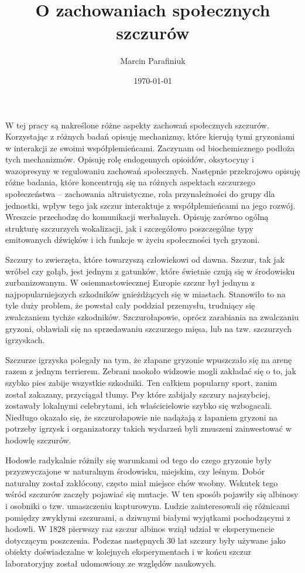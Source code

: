 \documentclass{psychol}
\title{O zachowaniach społecznych szczurów}
\author{Marcin Parafiniuk}
\date{\today}
\begin{document}
\maketitle
\tableofcontents
\doublespacing

\pagebreak


W tej pracy są nakreślone różne aspekty zachowań społecznych szczurów. Korzystając z różnych badań opisuję mechanizmy, które kierują tymi gryzoniami w interakcji ze swoimi współplemieńcami. Zaczynam od biochemicznego podłoża tych mechanizmów. Opisuję rolę endogennych opioidów, oksytocyny i wazopresyny w regulowaniu zachowań społecznych. Następnie przekrojowo opisuję różne badania, które koncentrują się na różnych aspektach szczurzego społeczeństwa -- zachowania altruistyczne, rola przynależności do grupy dla jednostki, wpływ tego jak szczur interaktuje z współplemieńcami na jego rozwój. Wreszcie przechodzę do komunikacji werbalnych. Opisuję zarówno ogólną strukturę szczurzych wokalizacji, jak i szczegółowo poszczególne typy emitowanych dźwięków i ich funkcje w życiu społeczności tych gryzoni.


Szczury to zwierzęta, które towarzyszą człowiekowi od dawna. Szczur, tak jak wróbel czy gołąb, jest jednym z gatunków, które świetnie czują się w środowisku zurbanizowanym. W osiemnastowiecznej Europie szczur był jednym z najpopularniejszych szkodników gnieżdżących się w miastach. Stanowiło to na tyle duży problem, że powstał cały poddział przemysłu, trudniący się zwalczaniem tychże szkodników. Szczurołapowie, oprócz zarabiania na zwalczaniu gryzoni, obławiali się na sprzedawaniu szczurzego mięsa, lub na tzw. szczurzych igrzyskach.

Szczurze igrzyska polegały na tym, że złapane gryzonie wpuszczało się na arenę razem z jednym terrierem. Zebrani naokoło widzowie mogli zakładać się o to, jak szybko pies zabije wszystkie szkodniki. Ten całkiem popularny sport, zanim został zakazany, przyciągał tłumy. Psy które zabijały szczury najszybciej, zostawały lokalnymi celebrytami, ich właścicielowie szybko się wzbogacali. Niedługo okazało się, że szczurołapowie nie nadążają z łapaniem gryzoni na potrzeby igrzysk i organizatorzy takich wydarzeń byli zmuszeni zainwestować w hodowlę szczurów.

Hodowle radykalnie różniły się warunkami od tego do czego gryzonie były przyzwyczajone w naturalnym środowisku, miejskim, czy leśnym. Dobór naturalny został zakłócony, często miał miejsce chów wsobny. Wskutek tego wśród szczurów zaczęły pojawiać się mutacje. W ten sposób pojawiły się albinosy i osobniki o tzw. umaszczeniu kapturowym. Ludzie zainteresowali się różnicami pomiędzy zwykłymi szczurami, a dziwnymi białymi wyjątkami pochodzącymi z hodowli. W 1828 pierwszy raz szczur albinos wziął udział w eksperymencie dotyczącym poszczenia. Podczas następnych 30 lat szczury były używane jako obiekty doświadczalne w kolejnych eksperymentach i w końcu szczur laboratoryjny został udomowiony ze względów naukowych.
\end{document}
